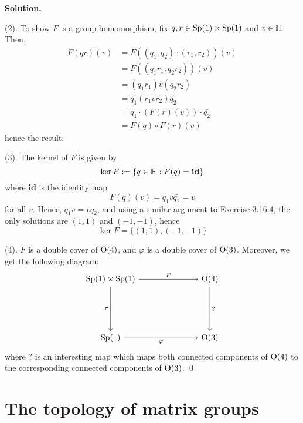 \documentclass[12pt]{book}
\theoremstyle{definition}
\newenvironment{solution}
{%
  \par\noindent\textbf{Solution.}\quad
}
{%
  \qed\par
}
\begin{document}
\begin{solution}
  (2). To show $F$ is a group homomorphism, fix $q, r \in \mathrm{Sp}(1) \times \mathrm{Sp}(1)$ and $v \in \mathbb{H}$.
  Then, 
  \[
  \begin{aligned}
    F(qr)(v) &= F((q_1, q_2) \cdot (r_1, r_2))(v) \\
             &= F((q_1r_1, q_2r_2))(v) \\
             &= (q_1r_1)v(\overline{q_2r_2}) \\
             &= q_1(r_1v\bar{r_2})\bar{q_2} \\
             &= q_1 \cdot (F(r)(v)) \cdot\bar{q_2} \\
             &= F(q) \circ F(r) (v)
  \end{aligned}
  \]
  hence the result. 

  (3). The kernel of $F$ is given by
  \[
  \ker{F} := \{q \in \mathbb{H} : F(q) = \textbf{id}\}
  \]
  where $\textbf{id}$ is the identity map 
  \[
  F(q)(v) = q_1v\bar{q_2} = v
  \]
  for all $v$. 
  Hence, $q_1v = vq_2$, and using a similar argument to Exercise 3.16.4, the only solutions are $(1,1)$ and $(-1, -1)$, hence
  \[\ker{F} = \{(1,1), (-1,-1)\}\]

  (4). $F$ is a double cover of $\mathrm{O}(4)$, and $\varphi$ is a double cover of $\mathrm{O}(3)$.
  Moreover, we get the following diagram:
  \[\begin{tikzcd}
    {\Sp{1} \times \Sp{1}} &&& \Ogroup{4} \\
    \\
    \\
    {\Sp{1}} &&& {\Ogroup{3}}
    \arrow["{F}", from=1-1, to=1-4]
    \arrow["\pi"', from=1-1, to=4-1]
    \arrow["{\varphi}"', from=4-1, to=4-4]
    \arrow["?", from=1-4, to=4-4]
  \end{tikzcd}\]
  where $?$ is an interesting map which maps both connected components of $\mathrm{O}(4)$ to the corresponding connected components of $\mathrm{O}(3)$.
\end{solution}

\begin{taggedexercise}[TODO]

\end{taggedexercise}




\chapter{The topology of matrix groups}
\end{document}
